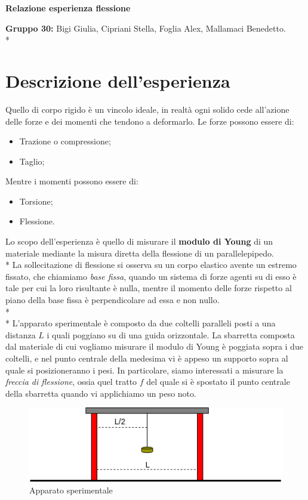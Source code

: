 \documentclass[10pt,a4paper]{book}
\begin{document}
	\begin{center}
		\Large {\textbf{Relazione esperienza flessione}}
    \end{center}
\textbf{Gruppo 30: }Bigi Giulia, Cipriani Stella, Foglia Alex, Mallamaci Benedetto.
\mbox{}\\*
\section*{Descrizione dell'esperienza}
Quello di corpo rigido è un vincolo ideale, in realtà ogni solido cede all'azione delle forze e dei momenti che tendono a deformarlo. Le forze possono essere di:
\begin{itemize}
	\item Trazione o compressione;
	\item Taglio;
\end{itemize}
Mentre i momenti possono essere di:
\begin{itemize}
	\item Torsione;
	\item Flessione.
\end{itemize}
Lo scopo dell'esperienza è quello di misurare il \textbf{modulo di Young} di un materiale mediante la misura diretta della flessione di un parallelepipedo.\\*
La sollecitazione di flessione si osserva su un corpo elastico avente un estremo fissato, che chiamiamo \emph{base fissa}, quando un sistema di forze agenti su di esso è tale per cui la loro risultante è nulla, mentre il momento delle forze rispetto al piano della base fissa è perpendicolare ad essa e non nullo.\\*\\*
L'apparato sperimentale è composto da due coltelli paralleli posti a una distanza $L$ i quali poggiano su di una guida orizzontale. La sbarretta composta dal materiale di cui vogliamo misurare il modulo di Young è poggiata sopra i due coltelli, e nel punto centrale della medesima vi è appeso un supporto sopra al quale si posizioneranno i pesi. In particolare, siamo interessati a misurare la \emph{freccia di flessione}, ossia quel tratto $f$ del quale si è spostato il punto centrale della sbarretta quando vi applichiamo un peso noto.
\begin{figure}[h]
	\centering
	\includegraphics[width=0.7\linewidth]{appexp}
	\caption{Apparato sperimentale}
	\label{fig:appexp}
\end{figure}
\end{document}
